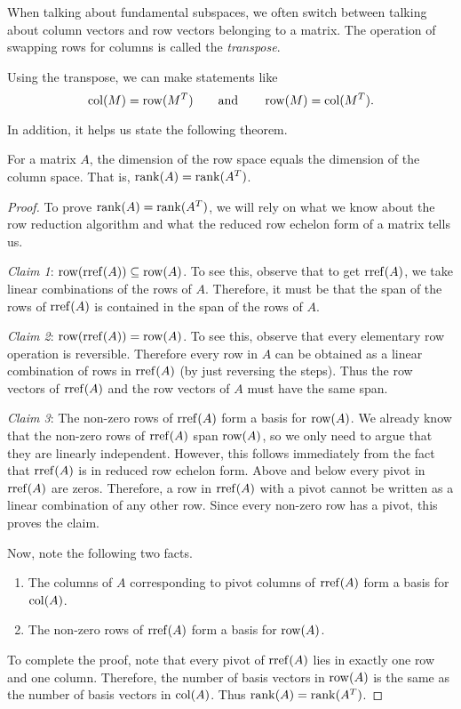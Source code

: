 When talking about fundamental subspaces, we often switch between talking about column vectors and
row vectors belonging to a matrix. The operation of swapping rows for columns is
called the \emph{transpose}.


Using the transpose, we can make statements like
\[
	\operatorname{col}(M)=\operatorname{row}(M^T)\qquad\text{and}\qquad \operatorname{row}(M)=\operatorname{col}(M^T).
\]

In addition, it helps us state the following theorem.
\begin{theorem}
	For a matrix $A$, the dimension of the row space equals the dimension of the column space. That is,
	$\operatorname{rank}(A)=\operatorname{rank}(A^T)$.
\end{theorem}
\begin{proof}
	To prove $\operatorname{rank}(A)=\operatorname{rank}(A^T)$, we will rely on what we know about the row reduction algorithm and what
	the reduced row echelon form of a matrix tells us. 

	\emph{Claim 1}: $\operatorname{row}(\operatorname{rref}(A))\subseteq \operatorname{row}(A)$. To see this, observe that to get $\operatorname{rref}(A)$, we take
	linear combinations of the rows of $A$. Therefore, it must be that the span of the rows of $\operatorname{rref}(A)$
	is contained in the span of the rows of $A$.

	\emph{Claim 2}: $\operatorname{row}(\operatorname{rref}(A))=\operatorname{row}(A)$. To see this, observe that every elementary row operation is
	reversible. Therefore every row in $A$ can be obtained as a linear combination of rows in $\operatorname{rref}(A)$
	(by just reversing the steps). Thus the row vectors of $\operatorname{rref}(A)$ and the row vectors of $A$ must
	have the same span.

	\emph{Claim 3}: The non-zero rows of $\operatorname{rref}(A)$ form a basis for $\operatorname{row}(A)$. We already know that
	the non-zero rows of $\operatorname{rref}(A)$ span $\operatorname{row}(A)$, so we only need to argue that they are linearly
	independent. However, this follows immediately from the fact that $\operatorname{rref}(A)$ is in reduced row
	echelon form. Above and below every pivot in $\operatorname{rref}(A)$ are zeros. Therefore, a row in $\operatorname{rref}(A)$
	with a pivot cannot be written as a linear combination of any other row. Since every non-zero
	row has a pivot, this proves the claim.
	
	Now, note the following two facts.
	\begin{enumerate}
		\item The columns of $A$ corresponding to pivot columns of $\operatorname{rref}(A)$ form a basis for $\operatorname{col}(A)$.
		\item The non-zero rows of $\operatorname{rref}(A)$ form a basis for $\operatorname{row}(A)$.
	\end{enumerate}

	To complete the proof, note that every pivot of $\operatorname{rref}(A)$ lies in exactly one row and one column. Therefore,
	the number of basis vectors in $\operatorname{row}(A)$ is the same as the number of basis vectors in $\operatorname{col}(A)$. Thus
	$\operatorname{rank}(A)=\operatorname{rank}(A^T)$.
\end{proof}

